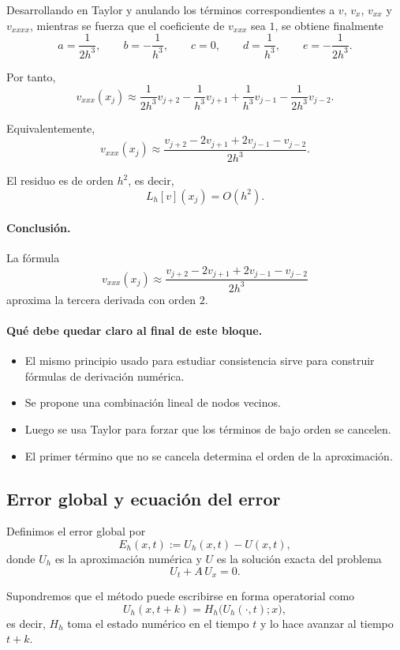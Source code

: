 Desarrollando en Taylor y anulando los términos correspondientes a \(v\), \(v_x\), \(v_{xx}\) y \(v_{xxxx}\), mientras se fuerza que el coeficiente de \(v_{xxx}\) sea \(1\), se obtiene finalmente
\[
a=\frac{1}{2h^3},\qquad
b=-\frac{1}{h^3},\qquad
c=0,\qquad
d=\frac{1}{h^3},\qquad
e=-\frac{1}{2h^3}.
\]

Por tanto,
\[
v_{xxx}(x_j)
\approx
\frac{1}{2h^3}v_{j+2}
-\frac{1}{h^3}v_{j+1}
+\frac{1}{h^3}v_{j-1}
-\frac{1}{2h^3}v_{j-2}.
\]

Equivalentemente,
\[
v_{xxx}(x_j)
\approx
\frac{v_{j+2}-2v_{j+1}+2v_{j-1}-v_{j-2}}{2h^3}.
\]

El residuo es de orden \(h^2\), es decir,
\[
L_h[v](x_j)=O(h^2).
\]

\paragraph{Conclusión.}
La fórmula
\[
v_{xxx}(x_j)
\approx
\frac{v_{j+2}-2v_{j+1}+2v_{j-1}-v_{j-2}}{2h^3}
\]
aproxima la tercera derivada con orden \(2\).

\paragraph{Qué debe quedar claro al final de este bloque.}
\begin{itemize}
    \item El mismo principio usado para estudiar consistencia sirve para construir fórmulas de derivación numérica.
    \item Se propone una combinación lineal de nodos vecinos.
    \item Luego se usa Taylor para forzar que los términos de bajo orden se cancelen.
    \item El primer término que no se cancela determina el orden de la aproximación.
\end{itemize}

\subsection{Error global y ecuación del error}

Definimos el error global por
\[
E_h(x,t):=U_h(x,t)-U(x,t),
\]
donde \(U_h\) es la aproximación numérica y \(U\) es la solución exacta del problema
\[
U_t+A\,U_x=0.
\]

Supondremos que el método puede escribirse en forma operatorial como
\[
U_h(x,t+k)=H_h\bigl(U_h(\cdot,t);x\bigr),
\]
es decir, \(H_h\) toma el estado numérico en el tiempo \(t\) y lo hace avanzar al tiempo \(t+k\).

